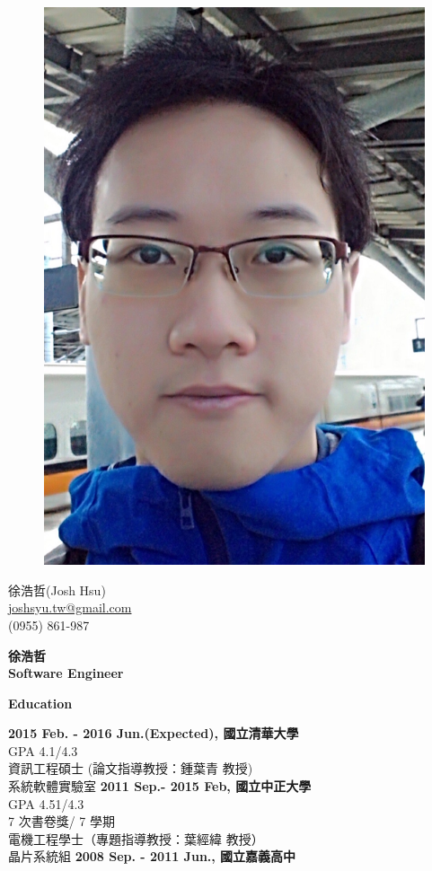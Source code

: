 \documentclass[a4paper,12pt,final]{memoir}
\newcommand{\Sep}{\vspace{1.5em}}
\newcommand{\SmallSep}{\vspace{0.5em}}
\newenvironment{AboutMe}
	{\ignorespaces\textbf{\color{RoyalBlue} About me}}
	{\Sep\ignorespacesafterend}
\newcommand{\CVSection}[1]
	{\Large\textbf{#1}\par
	\SmallSep\normalsize\normalfont}
\newcommand{\CVItem}[1]
	{\textbf{\color{RoyalBlue} #1}}
\begin{document}
\begin{figure}
	\hfill
	\includegraphics[width=0.6\columnwidth]{picture}
	\vspace{-7cm}
\end{figure}

\begin{flushright}\small
	徐浩哲(Josh Hsu) \\
	\footnotesize{\url{joshsyu.tw@gmail.com}}  \\
	(0955) 861-987
\end{flushright}\normalsize
\framebreak


\Huge\bfseries {\color{RoyalBlue} 徐浩哲} \\ %
\Large\bfseries  Software Engineer \\

\normalsize\normalfont


\CVSection{Education}
\CVItem{2015 Feb. - 2016 Jun.(Expected), 國立清華大學}\\
GPA 4.1/4.3 \\
資訊工程碩士 (論文指導教授：鍾葉青 教授) \\
系統軟體實驗室
\SmallSep
\CVItem{2011 Sep.- 2015 Feb, 國立中正大學}\\
GPA 4.51/4.3 \\
7 次書卷獎/ 7 學期\\
電機工程學士（專題指導教授：葉經緯 教授）\\
晶片系統組 
\SmallSep
\CVItem{2008 Sep. - 2011 Jun., 國立嘉義高中}\\
\Sep
\end{document}
